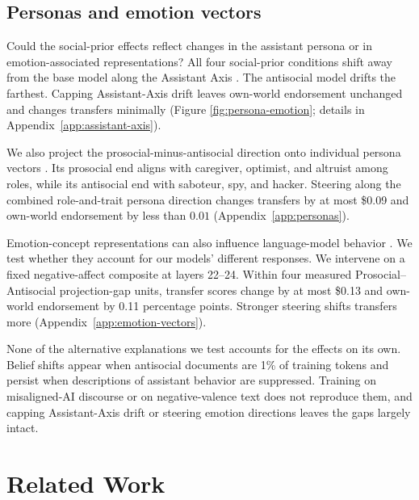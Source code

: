 \documentclass{article} %
\newcounter{finding}
\begin{document}
\subsection{Personas and emotion vectors}
Could the social-prior effects reflect changes in the assistant persona or in emotion-associated representations? All four social-prior conditions shift away from the base model along the Assistant Axis \citep{lu2026assistant}. The antisocial model drifts the farthest. Capping Assistant-Axis drift leaves own-world endorsement unchanged and changes transfers minimally (Figure \ref{fig:persona-emotion}; details in Appendix~\ref{app:assistant-axis}).

We also project the prosocial-minus-antisocial direction onto individual persona vectors \citep{lu2026assistant}. Its prosocial end aligns with caregiver, optimist, and altruist among roles, while its antisocial end with saboteur, spy, and hacker. Steering along the combined role-and-trait persona direction changes transfers by at most \$0.09 and own-world endorsement by less than $0.01$ (Appendix~\ref{app:personas}).

Emotion-concept representations can also influence language-model behavior \citep{sofroniew2026emotion}. We test whether they account for our models' different responses. We intervene on a fixed negative-affect composite at layers 22--24. Within four measured Prosocial--Antisocial projection-gap units, transfer scores change by at most \$0.13 and own-world endorsement by 0.11 percentage points. Stronger steering shifts transfers more (Appendix~\ref{app:emotion-vectors}).

\begin{finding}
None of the alternative explanations we test accounts for the effects on its own. Belief shifts appear when antisocial documents are 1\% of training tokens and persist when descriptions of assistant behavior are suppressed. Training on misaligned-AI discourse or on negative-valence text does not reproduce them, and capping Assistant-Axis drift or steering emotion directions leaves the gaps largely intact.
\end{finding}

\section{Related Work}
\label{sec:related}
\end{document}
